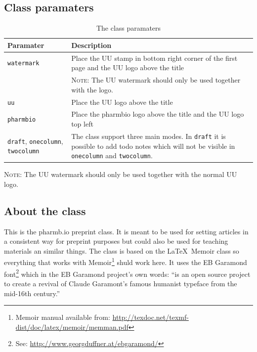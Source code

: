 \documentclass[pharmbio, watermark]{pbpreprint}
\begin{document}
\subsection{Class paramaters}
\begin{table}[H]
\caption{The class paramaters}
\centering
\begin{tabular}{p{}p{}}
    \toprule
    Paramater & Description \\
    \midrule
    \texttt{watermark} & Place the UU stamp in bottom right corner of the first
                         page and the UU logo above the title \\ 
                       & \textsc{Note}: The UU watermark should only be used
                         together with the logo.\\[10pt]
    \texttt{uu}        & Place the UU logo above the title \\[10pt]
    \texttt{pharmbio}  & Place the \textsf{pharmbio} logo above the title and the UU logo top left \\[10pt]
    \texttt{draft}, \texttt{onecolumn}, \texttt{twocolumn} & 
    The class support three main modes. In \texttt{draft} it is possible to add
    todo notes which will not be visible in \texttt{onecolumn} and
    \texttt{twocolumn}. \\
    \bottomrule
\end{tabular}
    \begin{flushleft}
        {\footnotesize \textsc{Note}: The UU watermark should only be used
                                      together with the normal UU logo.}
    \end{flushleft}
\end{table}

\subsection{About the class}
This is the pharm\textcolor{uured}{b.io} preprint class. It is meant to be used
for setting articles in a consistent way for preprint purposes but could also
be used for teaching materials an similar things. The class is based on the
\LaTeX\ Memoir class so everything that works with Memoir\footnote{Memoir
manual available from:
\url{http://texdoc.net/texmf-dist/doc/latex/memoir/memman.pdf}} shuld work
here. It uses the EB Garamond font\footnote{See:
\url{http://www.georgduffner.at/ebgaramond/}} which in the EB Garamond
project's own words: ``is an open source project to create a revival of Claude
Garamont’s famous humanist typeface from the mid-16th century.''
\end{document}
